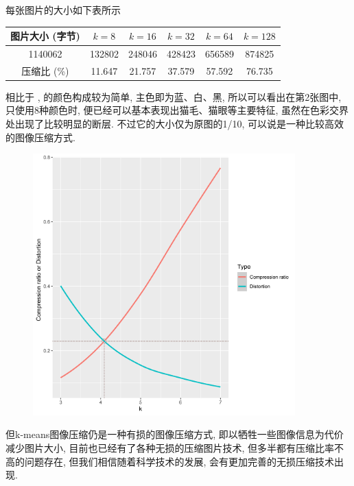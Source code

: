 \documentclass[lang=cn,11pt]{elegantpaper}
\begin{document}
每张图片的大小如下表所示
\begin{table}[ht]
    \centering
    \begin{tabular}{c|ccccc}
    \hline
    图片大小 (字节)  & $k=8$    & $k=16$   & $k=32$   & $k=64$   & $k=128$  \\ \hline
    1140062  & 132802 & 248046 & 428423 & 656589 & 874825 \\
    压缩比 (\%) & 11.647 & 21.757 & 37.579 & 57.592 & 76.735 \\ \hline
    \end{tabular}
\end{table}

相比于 ,  的颜色构成较为简单, 主色即为蓝、白、黑, 所以可以看出在第2张图中, 只使用8种颜色时, 便已经可以基本表现出猫毛、猫眼等主要特征, 虽然在色彩交界处出现了比较明显的断层. 不过它的大小仅为原图的1/10, 可以说是一种比较高效的图像压缩方式. 



\begin{figure}[ht]
\centering
  \includegraphics[width=0.9\textwidth]{cat2to}
  \caption{\label{cat2tradeoff}}
\end{figure}







但k-means图像压缩仍是一种有损的图像压缩方式, 即以牺牲一些图像信息为代价减少图片大小, 目前也已经有了各种无损的压缩图片技术, 但多半都有压缩比率不高的问题存在, 但我们相信随着科学技术的发展, 会有更加完善的无损压缩技术出现. 
\end{document}
